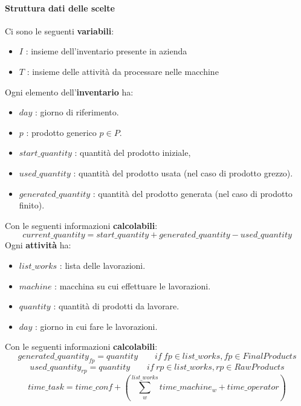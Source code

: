 \paragraph{Struttura dati delle scelte}
Ci sono le seguenti \textbf{variabili}:
\begin{itemize}
    \item \(I\) : insieme dell'inventario presente in azienda
    \item \(T\) : insieme delle attività da processare nelle macchine
\end{itemize}
Ogni elemento dell'\textbf{inventario} ha:
\begin{itemize}
    \item \(day\) :  giorno di riferimento.
    \item \(p\) :  prodotto generico \(p \in P\).
    \item \(start\_quantity\) : quantità del prodotto iniziale,
    \item \(used\_quantity\) : quantità del prodotto usata (nel caso di prodotto grezzo).
    \item \(generated\_quantity\) : quantità del prodotto generata (nel caso di prodotto finito).
\end{itemize}
Con le seguenti informazioni \textbf{calcolabili}: 
\begin{equation} \label{eq:current_quantity}
    current\_quantity = start\_quantity + generated\_quantity - used\_quantity
\end{equation}
Ogni \textbf{attività} ha:
\begin{itemize}
    \item \(list\_works\) : lista delle lavorazioni.
    \item \(machine\) : macchina su cui effettuare le lavorazioni.
    \item \(quantity\) : quantità di prodotti da lavorare.
    \item \(day\) : giorno in cui fare le lavorazioni.
\end{itemize}
Con le seguenti informazioni \textbf{calcolabili}:
\begin{equation} \label{eq:genarate_quantity_fp}
    generated\_quantity_{fp} = quantity \qquad if\ fp \in list\_works, fp \in FinalProducts
\end{equation}
\begin{equation} \label{eq:used_quantity_rp}
    used\_quantity_{rp} = quantity \qquad if\ rp \in list\_works, rp \in RawProducts
\end{equation}
\begin{equation} \label{eq:time_task}
    time\_task = time\_conf + \left( \sum_{w}^{list\_works} time\_machine_w + time\_operator \right)
\end{equation}


